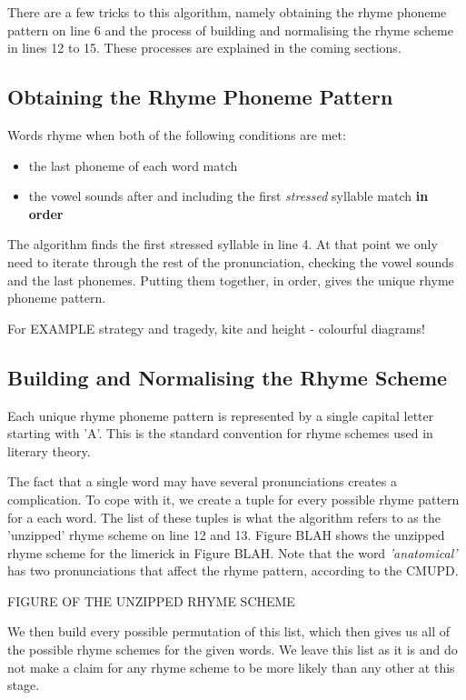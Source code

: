 There are a few tricks to this algorithm, namely obtaining the rhyme phoneme pattern on line 6 and the process of building and normalising the rhyme scheme in lines 12 to 15. These processes are explained in the coming sections.

\subsection{Obtaining the Rhyme Phoneme Pattern}

Words rhyme when both of the following conditions are met:
\begin{itemize}
\item{the last phoneme of each word match}
\item{the vowel sounds after and including the first \textit{stressed} syllable match \textbf{in order}}
\end{itemize}

The algorithm finds the first stressed syllable in line 4. At that point we only need to iterate through the rest of the pronunciation, checking the vowel sounds and the last phonemes. Putting them together, in order, gives the unique rhyme phoneme pattern. 

For EXAMPLE strategy and tragedy, kite and height - colourful diagrams!			

\subsection{Building and Normalising the Rhyme Scheme}

Each unique rhyme phoneme pattern is represented by a single capital letter starting with 'A'. This is the standard convention for rhyme schemes used in literary theory. 

The fact that a single word may have several pronunciations creates a complication. To cope with it, we create a tuple for every possible rhyme pattern for a each word. The list of these tuples is what the algorithm refers to as the 'unzipped' rhyme scheme on line 12 and 13. Figure BLAH shows the unzipped rhyme scheme for the limerick in Figure BLAH. Note that the word \textit{'anatomical'} has two pronunciations that affect the rhyme pattern, according to the CMUPD.

FIGURE OF THE UNZIPPED RHYME SCHEME

We then build every possible permutation of this list, which then gives us all of the possible rhyme schemes for the given words. We leave this list as it is and do not make a claim for any rhyme scheme to be more likely than any other at this stage.

